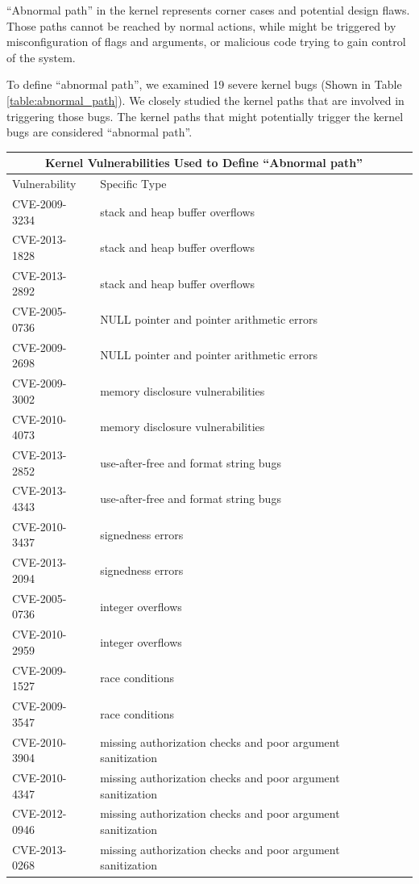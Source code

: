 ``Abnormal path'' in the kernel represents corner cases and potential design flaws. Those paths cannot be reached by 
normal actions, while might be triggered by misconfiguration of flags and arguments, or malicious code trying to 
gain control of the system.  

To define ``abnormal path'', we examined 19 severe kernel bugs (Shown in Table \ref{table:abnormal_path}). 
We closely studied the kernel paths that are involved in triggering those bugs. The kernel paths that might potentially 
trigger the kernel bugs are considered ``abnormal path''. 


\begin{table}[t]
\begin{tabular*}{\textwidth}{l @{\extracolsep{\fill}} lc}
\toprule
\multicolumn{2}{c}{Kernel Vulnerabilities Used to Define ``Abnormal path''} \\

\midrule
Vulnerability    &  Specific Type \\
\midrule
 CVE-2009-3234 \cite{CVE:20093234} & stack and heap buffer overflows \\
 CVE-2013-1828 \cite{CVE:20131828} & stack and heap buffer overflows \\
 CVE-2013-2892 \cite{CVE:20132892} & stack and heap buffer overflows \\
 CVE-2005-0736 \cite{CVE:20050736} & NULL pointer and pointer arithmetic errors \\
 CVE-2009-2698 \cite{CVE:20092698} & NULL pointer and pointer arithmetic errors \\
 CVE-2009-3002 \cite{CVE:20093002} &  memory disclosure vulnerabilities \\
 CVE-2010-4073 \cite{CVE:20104073} &  memory disclosure vulnerabilities \\
 CVE-2013-2852 \cite{CVE:20132852} &  use-after-free and format string bugs \\
 CVE-2013-4343 \cite{CVE:20134343} &  use-after-free and format string bugs \\
 CVE-2010-3437 \cite{CVE:20103437} &  signedness errors \\
 CVE-2013-2094 \cite{CVE:20132094} &  signedness errors \\
 CVE-2005-0736 \cite{CVE:20050736} &  integer overflows \\
 CVE-2010-2959 \cite{CVE:20102959} &  integer overflows \\
 CVE-2009-1527 \cite{CVE:20091527} &  race conditions \\
 CVE-2009-3547 \cite{CVE:20093547} &  race conditions \\
 CVE-2010-3904 \cite{CVE:20103904} &  missing authorization checks and poor argument sanitization\\
 CVE-2010-4347 \cite{CVE:20104347} &  missing authorization checks and poor argument sanitization\\
 CVE-2012-0946 \cite{CVE:20120946} &  missing authorization checks and poor argument sanitization\\
 CVE-2013-0268 \cite{CVE:20130268} &  missing authorization checks and poor argument sanitization\\


\end{tabular*}
\end{table}
